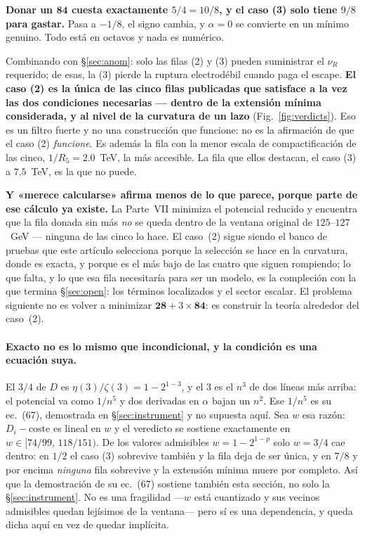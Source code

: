 \documentclass[11pt,a4paper]{article}
\newcommand{\rep}[1]{\mathbf{#1}}
\newenvironment{keyeq}
  {\begin{center}\setlength{\fboxsep}{9pt}\setlength{\fboxrule}{0.8pt}%
   \begin{lrbox}{\keyeqbox}\begin{minipage}{0.88\textwidth}}
  {\end{minipage}\end{lrbox}%
   \fcolorbox{hdrblue!55}{hdrblue!6}{\usebox{\keyeqbox}}\end{center}}
\begin{document}
\begin{keyeq}
\textbf{Donar un $\rep{84}$ cuesta exactamente $5/4=10/8$, y el caso (3) solo tiene $9/8$ para
gastar.} Pasa a $-1/8$, el signo cambia, y $\alpha=0$ se convierte en un mínimo genuino. Todo está
en octavos y nada es numérico.

Combinando con \S\ref{sec:anom}: solo las filas (2) y (3) pueden suministrar el $\nu_R$ requerido; de
esas, la (3) pierde la ruptura electrodébil cuando paga el escape. \textbf{El caso (2) es la única de
las cinco filas publicadas que satisface a la vez las dos condiciones necesarias --- dentro de la
extensión mínima considerada, y al nivel de la curvatura de un lazo} (Fig.~\ref{fig:verdicts}). Eso
es un filtro fuerte y no una construcción que funcione: no es la afirmación de que el caso (2)
\emph{funcione}. Es además la fila con la menor escala de compactificación de las cinco,
$1/R_5=2.0$~TeV, la más accesible. La fila que ellos destacan, el caso
(3) a $7.5$~TeV, es la que no puede.
\end{keyeq}

\noindent
\textbf{Y «merece calcularse» afirma menos de lo que parece, porque parte de ese cálculo ya existe.}
La Parte~VII \cite{PartVII} minimiza el potencial reducido y encuentra que la fila donada sin más
\emph{no} se queda dentro de la ventana original de $125$--$127$~GeV --- ninguna de las cinco lo
hace. El caso~(2) sigue siendo el banco de pruebas que este artículo selecciona porque la selección
se hace en la curvatura, donde es exacta, y porque es el más bajo de las cuatro que siguen rompiendo;
lo que falta, y lo que esa fila necesitaría para ser un modelo, es la compleción con la que termina
\S\ref{sec:open}: los términos localizados y el sector escalar. El problema siguiente no es volver a
minimizar $\rep{28}+3\times\rep{84}$: es construir la teoría alrededor del caso~(2).

\paragraph{Exacto no es lo mismo que incondicional, y la condición es una ecuación suya.} El
$3/4$ de $D$ es $\eta(3)/\zeta(3)=1-2^{1-3}$, y el $3$ es el $n^3$ de dos líneas más arriba: el
potencial va como $1/n^5$ y dos derivadas en $\alpha$ bajan un $n^2$. Ese $1/n^5$ es su ec.~(67),
demostrada en \S\ref{sec:instrument} y no supuesta aquí. Sea $w$ esa razón:
$D_i-\text{coste}$ es lineal en $w$ y el veredicto se sostiene exactamente en
$w\in[74/99,\,118/151)$. De los valores admisibles $w=1-2^{1-p}$ solo $w=3/4$ cae dentro: en $1/2$ el
caso (3) sobrevive también y la fila deja de ser única, y en $7/8$ y por encima \emph{ninguna} fila
sobrevive y la extensión mínima muere por completo. Así que la demostración de su ec.~(67) sostiene
también esta sección, no solo la \S\ref{sec:instrument}. No es una fragilidad ---$w$ está cuantizado
y sus vecinos admisibles quedan lejísimos de la ventana--- pero sí es una dependencia, y queda dicha
aquí en vez de quedar implícita.
\end{document}
